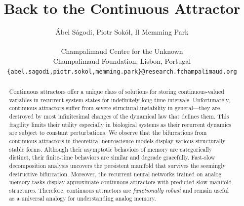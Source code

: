\documentclass{article} %
\title{Back to the Continuous Attractor}
\author{%
    \'Abel S\'agodi, Piotr Sok\'o\l, Il Memming Park \\
    \\
    Champalimaud Centre for the Unknown\\
    Champalimaud Foundation, Lisbon, Portugal\\
    \texttt{\{abel.sagodi,piotr.sokol,memming.park\}@research.fchampalimaud.org} \\
}
\newcounter{ct}
\theoremstyle{definition}
\theoremstyle{remark}
\begin{document}


\maketitle

\begin{abstract}
Continuous attractors offer a unique class of solutions for storing continuous-valued variables in recurrent system states for indefinitely long time intervals.
Unfortunately, continuous attractors suffer from severe structural instability in general---they are destroyed by most infinitesimal changes of the dynamical law that defines them.
This fragility limits their utility especially in biological systems as their recurrent dynamics are subject to constant perturbations.
We observe that the bifurcations from continuous attractors in theoretical neuroscience models display various structurally stable forms.
Although their asymptotic behaviors of memory are categorically distinct, their finite-time behaviors are similar and degrade gracefully.
Fast-slow decomposition analysis uncovers the persistent manifold that survives the seemingly destructive bifurcation.
Moreover, the recurrent neural networks trained on analog memory tasks display approximate continuous attractors with predicted slow manifold structures.
Therefore, continuous attractors are \emph{functionally robust} and remain useful as a universal analogy for understanding analog memory.
\end{abstract}
\end{document}
